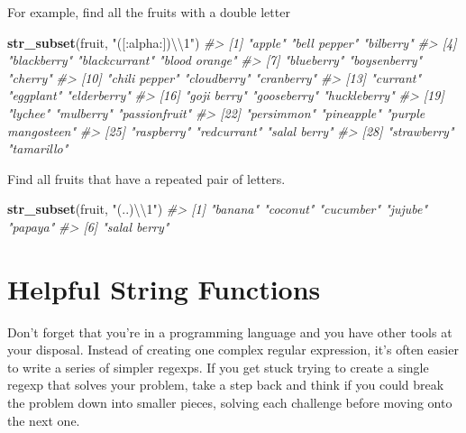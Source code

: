 \documentclass[]{book}
\newenvironment{Shaded}{\begin{snugshade}}{\end{snugshade}}
\newcommand{\KeywordTok}[1]{\textcolor[rgb]{0.13,0.29,0.53}{\textbf{#1}}}
\newcommand{\CharTok}[1]{\textcolor[rgb]{0.31,0.60,0.02}{#1}}
\newcommand{\StringTok}[1]{\textcolor[rgb]{0.31,0.60,0.02}{#1}}
\newcommand{\CommentTok}[1]{\textcolor[rgb]{0.56,0.35,0.01}{\textit{#1}}}
\newcommand{\NormalTok}[1]{#1}
\begin{document}
For example, find all the fruits with a double letter

\begin{Shaded}
\begin{Highlighting}[]
\KeywordTok{str_subset}\NormalTok{(fruit, }\StringTok{"([:alpha:])}\CharTok{\textbackslash{}\textbackslash{}}\StringTok{1"}\NormalTok{)}
\CommentTok{#>  [1] "apple"             "bell pepper"       "bilberry"         }
\CommentTok{#>  [4] "blackberry"        "blackcurrant"      "blood orange"     }
\CommentTok{#>  [7] "blueberry"         "boysenberry"       "cherry"           }
\CommentTok{#> [10] "chili pepper"      "cloudberry"        "cranberry"        }
\CommentTok{#> [13] "currant"           "eggplant"          "elderberry"       }
\CommentTok{#> [16] "goji berry"        "gooseberry"        "huckleberry"      }
\CommentTok{#> [19] "lychee"            "mulberry"          "passionfruit"     }
\CommentTok{#> [22] "persimmon"         "pineapple"         "purple mangosteen"}
\CommentTok{#> [25] "raspberry"         "redcurrant"        "salal berry"      }
\CommentTok{#> [28] "strawberry"        "tamarillo"}
\end{Highlighting}
\end{Shaded}

Find all fruits that have a repeated pair of letters.

\begin{Shaded}
\begin{Highlighting}[]
\KeywordTok{str_subset}\NormalTok{(fruit, }\StringTok{"(..)}\CharTok{\textbackslash{}\textbackslash{}}\StringTok{1"}\NormalTok{)}
\CommentTok{#> [1] "banana"      "coconut"     "cucumber"    "jujube"      "papaya"     }
\CommentTok{#> [6] "salal berry"}
\end{Highlighting}
\end{Shaded}

\section{Helpful String Functions}\label{helpful-string-functions}

Don't forget that you're in a programming language and you have other
tools at your disposal. Instead of creating one complex regular
expression, it's often easier to write a series of simpler regexps. If
you get stuck trying to create a single regexp that solves your problem,
take a step back and think if you could break the problem down into
smaller pieces, solving each challenge before moving onto the next one.
\end{document}
